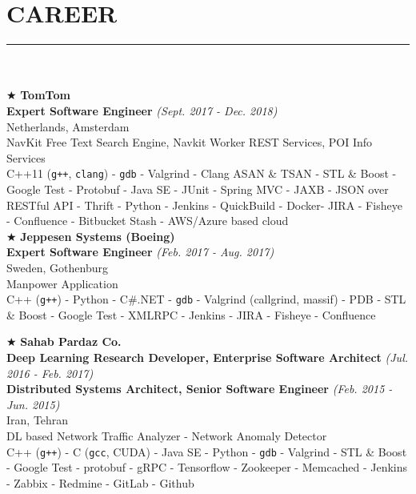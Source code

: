 \documentclass[10pt,a4paper]{article}
\begin{document}
\section{CAREER}
\noindent\rule {18.0cm}{0.2pt} \\ \\
$\bigstar$ \hspace{0.1cm} \large \textbf{TomTom} \\
\indent \small \textbf{Expert Software Engineer} \textsl{(Sept. 2017 - Dec. 2018)} \\
\indent \textnormal{Netherlands, Amsterdam} \\
\indent \textbullet \hspace{0.05cm} NavKit Free Text Search Engine, Navkit Worker REST Services, POI Info Services \\
\indent \textbullet \hspace{0.05cm} C++11 (\texttt{g++}, \texttt{clang}) - \texttt{gdb} - Valgrind - Clang ASAN \& TSAN - STL \& Boost - Google Test - Protobuf - Java SE - JUnit - Spring MVC - JAXB - JSON over RESTful API - Thrift - Python - Jenkins - QuickBuild - Docker- JIRA - Fisheye - Confluence - Bitbucket Stash - AWS/Azure based cloud \\

\noindent $\bigstar$ \hspace{0.1cm} \large \textbf{Jeppesen Systems (Boeing)} \\
\indent \small \textbf{Expert Software Engineer} \textsl{(Feb. 2017 - Aug. 2017)} \\
\indent \textnormal{Sweden, Gothenburg} \\
\indent \textbullet \hspace{0.05cm} Manpower Application \\
\indent \textbullet \hspace{0.05cm} C++ (\texttt{g++}) - Python - C\#.NET - \texttt{gdb} - Valgrind (callgrind, massif) - PDB - STL \& Boost - Google Test - XMLRPC - Jenkins - JIRA - Fisheye - Confluence

\break

\noindent $\bigstar$ \hspace{0.1cm} \large \textbf{Sahab Pardaz Co.} \\
\indent \small \textbf{Deep Learning Research Developer, Enterprise Software Architect} \textsl{(Jul. 2016 - Feb. 2017)} \\
\indent \small \textbf{Distributed Systems Architect, Senior Software Engineer} \textsl{(Feb. 2015 - Jun. 2015)} \\
\indent \textnormal{Iran, Tehran} \\
\indent \textbullet \hspace{0.05cm} DL based Network Traffic Analyzer - Network Anomaly Detector \\
\indent \textbullet \hspace{0.05cm} C++ (\texttt{g++}) - C (\texttt{gcc}, CUDA) - Java SE - Python - \texttt{gdb} - Valgrind - STL \& Boost - Google Test - protobuf - gRPC - Tensorflow - Zookeeper - Memcached - Jenkins - Zabbix - Redmine - GitLab - Github \\
\end{document}
